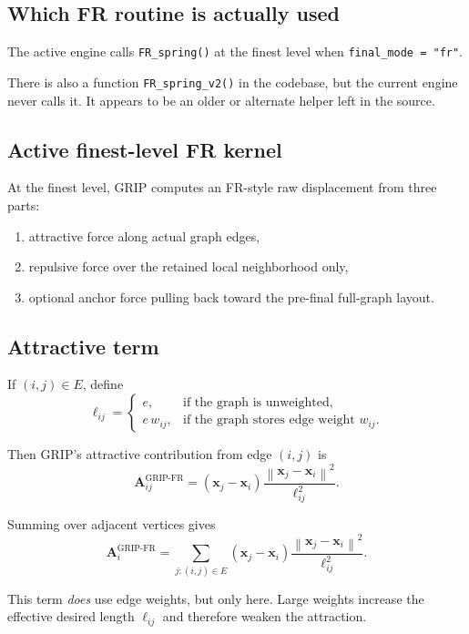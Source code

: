 \documentclass[11pt]{article}
\newcommand{\vect}[1]{\boldsymbol{#1}}
\newcommand{\norm}[1]{\left\lVert #1 \right\rVert}
\begin{document}
\subsection{Which FR routine is actually used}

The active engine calls \texttt{FR\_spring()} at the finest level when
\texttt{final\_mode = "fr"}.

There is also a function \texttt{FR\_spring\_v2()} in the codebase, but the
current engine never calls it. It appears to be an older or alternate helper
left in the source.

\subsection{Active finest-level FR kernel}

At the finest level, GRIP computes an FR-style raw displacement from three parts:
\begin{enumerate}[leftmargin=1.5em]
\item attractive force along actual graph edges,
\item repulsive force over the retained local neighborhood only,
\item optional anchor force pulling back toward the pre-final full-graph layout.
\end{enumerate}

\subsection{Attractive term}

If $(i,j) \in E$, define
\[
\ell_{ij} =
\begin{cases}
e, & \text{if the graph is unweighted},\\
e \, w_{ij}, & \text{if the graph stores edge weight } w_{ij}.
\end{cases}
\]

Then GRIP's attractive contribution from edge $(i,j)$ is
\[
\vect{A}_{ij}^{\text{GRIP-FR}}
=
(\vect{x}_j - \vect{x}_i)
\frac{\norm{\vect{x}_j - \vect{x}_i}^2}{\ell_{ij}^2}.
\]

Summing over adjacent vertices gives
\[
\vect{A}_i^{\text{GRIP-FR}}
=
\sum_{j:(i,j)\in E}
(\vect{x}_j - \vect{x}_i)
\frac{\norm{\vect{x}_j - \vect{x}_i}^2}{\ell_{ij}^2}.
\]

This term \emph{does} use edge weights, but only here. Large weights increase
the effective desired length $\ell_{ij}$ and therefore weaken the attraction.
\end{document}
